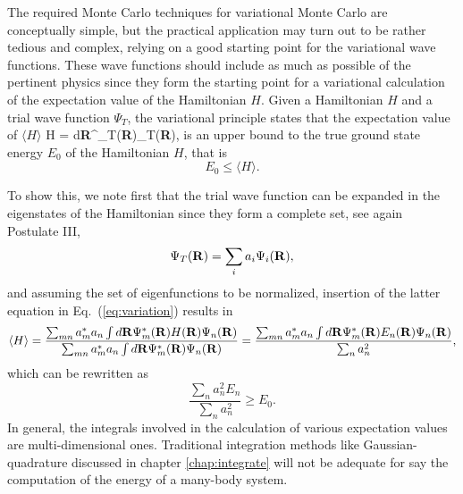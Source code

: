The required Monte Carlo techniques for variational Monte Carlo are conceptually
simple, but the practical application may turn out to be rather 
tedious and complex, relying on a good starting point for the 
variational wave functions. These wave functions should include as
much as possible of the pertinent physics since they
form the starting point for a variational calculation of the expectation
value of the Hamiltonian $H$. Given a Hamiltonian $H$ and a trial
wave function $\Psi_T$, the variational principle states that
the expectation value of $\langle H \rangle$ 
\be
   \langle H \rangle =
        {\int d{\bf R}\Psi^{\ast}_T({\bf R})\Psi_T({\bf R})},
      \label{eq:variation}
\ee
is an upper bound to the true ground state energy $E_0$ of the Hamiltonian $H$, that
is 
\[ 
    E_0 \le \langle H \rangle .
\]

To show this, we note first that the trial wave function can be expanded
in the eigenstates of the Hamiltonian since they form a complete set, see again Postulate III,
\[
   \Psi_T({\bf R})=\sum_i a_i\Psi_i({\bf R}),
\]
and assuming the set of eigenfunctions to be normalized, insertion of the 
latter equation in Eq.~(\ref{eq:variation}) results in
\[
   \langle H \rangle =
   \frac{\sum_{mn}a_m^{\ast}a_n\int d{\bf R}\Psi_m^{\ast}({\bf R})H({\bf R})\Psi_n({\bf R})}
        {\sum_{mn}a_m^{\ast}a_n\int d{\bf R}\Psi^{\ast}_m({\bf R})\Psi_n({\bf R})}
=
   \frac{\sum_{mn}a_m^{\ast}a_n\int d{\bf R}\Psi_m^{\ast}({\bf R})E_n({\bf R})\Psi_n({\bf R})}
        {\sum_{n}a^2_n},
\]
which can be rewritten
as
\[
   \frac{\sum_{n}a^2_n E_n}
        {\sum_{n}a^2_n} \ge E_0. 
\]
In general, the integrals involved in the calculation of various  expectation
values  are multi-dimensional ones. Traditional integration methods
like Gaussian-quadrature discussed in chapter \ref{chap:integrate}  
will not be adequate for say the 
computation of the energy of a many-body system.

